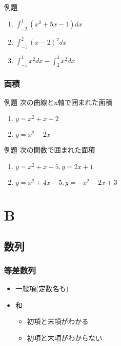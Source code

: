 \documentclass[10pt,dvipdfmx]{jsarticle}
\begin{document}
\begin{itembox}[l]{例題}
  \begin{large}
    \begin{enumerate}
      \item $\int_{-2}^{1}(x^2+5x-1)dx$
      \item $\int_{-1}^{2}(x-2)^2dx$
      \item $\int_{-1}^{1}x^2dx-\int_{2}^{1}x^2dx$
    \end{enumerate}
  \end{large}
\end{itembox}


\subsubsection*{面積}
\begin{itembox}[l]{例題}
  次の曲線とx軸で囲まれた面積
  \begin{large}
    \begin{enumerate}
      \item $y=x^2+x+2$
      \item $y=x^2-2x$
    \end{enumerate}
  \end{large}
\end{itembox}

\begin{itembox}[l]{例題}
  次の関数で囲まれた面積
  \begin{large}
    \begin{enumerate}
      \item $y=x^2+x-5, y=2x+1$
      \item $y=x^2+4x-5, y=-x^2-2x+3$
    \end{enumerate}
  \end{large}
\end{itembox}

\newpage
\section*{B}
\subsection*{数列}
\subsubsection*{等差数列}
\begin{itemize}
  \item 一般項(定数名も)
  \item 和
        \begin{itemize}
          \item 初項と末項がわかる
          \item 初項と末項がわからない
        \end{itemize}
\end{itemize}
\end{document}
